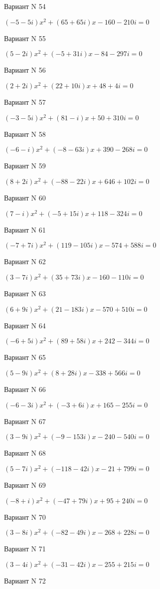 \documentclass[11pt]{report}
\begin{document}
Вариант N 54

$(-5 - 5 i)x^2 + (65 + 65 i)x  -160 - 210 i = 0$

Вариант N 55

$(5 - 2 i)x^2 + (-5 + 31 i)x  -84 - 297 i = 0$

Вариант N 56

$(2 + 2 i)x^2 + (22 + 10 i)x + 48 + 4 i = 0$

Вариант N 57

$(-3 - 5 i)x^2 + (81 - i)x + 50 + 310 i = 0$

Вариант N 58

$(-6 - i)x^2 + (-8 - 63 i)x + 390 - 268 i = 0$

Вариант N 59

$(8 + 2 i)x^2 + (-88 - 22 i)x + 646 + 102 i = 0$

Вариант N 60

$(7 - i)x^2 + (-5 + 15 i)x + 118 - 324 i = 0$

Вариант N 61

$(-7 + 7 i)x^2 + (119 - 105 i)x  -574 + 588 i = 0$

Вариант N 62

$(3 - 7 i)x^2 + (35 + 73 i)x  -160 - 110 i = 0$

Вариант N 63

$(6 + 9 i)x^2 + (21 - 183 i)x  -570 + 510 i = 0$

Вариант N 64

$(-6 + 5 i)x^2 + (89 + 58 i)x + 242 - 344 i = 0$

Вариант N 65

$(5 - 9 i)x^2 + (8 + 28 i)x  -338 + 566 i = 0$

Вариант N 66

$(-6 - 3 i)x^2 + (-3 + 6 i)x + 165 - 255 i = 0$

Вариант N 67

$(3 - 9 i)x^2 + (-9 - 153 i)x  -240 - 540 i = 0$

Вариант N 68

$(5 - 7 i)x^2 + (-118 - 42 i)x  -21 + 799 i = 0$

Вариант N 69

$(-8 + i)x^2 + (-47 + 79 i)x + 95 + 240 i = 0$

Вариант N 70

$(3 - 8 i)x^2 + (-82 - 49 i)x  -268 + 228 i = 0$

Вариант N 71

$(3 - 4 i)x^2 + (-31 - 42 i)x  -255 + 215 i = 0$

Вариант N 72
\end{document}
